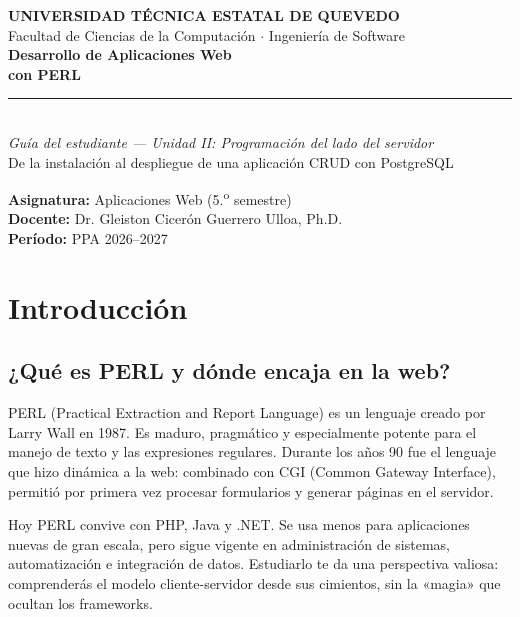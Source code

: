 \documentclass[11pt]{article}
\begin{document}
\begin{titlepage}
\vspace*{1.2cm}
{\color{uteqverde}\bfseries\large UNIVERSIDAD T\'ECNICA ESTATAL DE QUEVEDO}\\[2pt]
{\color{gray} Facultad de Ciencias de la Computaci\'on $\cdot$ Ingenier\'ia de Software}\\[2.2cm]
{\color{tinta}\bfseries\fontsize{30}{34}\selectfont Desarrollo de Aplicaciones Web}\\[6pt]
{\color{uteqverde}\bfseries\fontsize{30}{34}\selectfont con PERL}\\[10pt]
{\color{uteqoro}\rule{\linewidth}{2.2pt}}\\[10pt]
{\itshape\large Gu\'ia del estudiante --- Unidad II: Programaci\'on del lado del servidor}\\[4pt]
{\color{gray} De la instalaci\'on al despliegue de una aplicaci\'on CRUD con PostgreSQL}\\[3cm]
\begin{flushleft}
\textbf{Asignatura:} Aplicaciones Web (5.\textsuperscript{o} semestre)\\[3pt]
\textbf{Docente:} Dr. Gleiston Cicer\'on Guerrero Ulloa, Ph.D.\\[3pt]
\textbf{Per\'iodo:} PPA 2026--2027
\end{flushleft}
\vfill
\end{titlepage}
\tableofcontents
\clearpage
\section{Introducción}
\subsection{¿Qué es PERL y dónde encaja en la web?}
PERL (Practical Extraction and Report Language) es un lenguaje creado por Larry Wall en 1987. Es maduro, pragmático y especialmente potente para el manejo de texto y las expresiones regulares. Durante los años 90 fue el lenguaje que hizo dinámica a la web: combinado con CGI (Common Gateway Interface), permitió por primera vez procesar formularios y generar páginas en el servidor.

Hoy PERL convive con PHP, Java y .NET. Se usa menos para aplicaciones nuevas de gran escala, pero sigue vigente en administración de sistemas, automatización e integración de datos. Estudiarlo te da una perspectiva valiosa: comprenderás el modelo cliente-servidor desde sus cimientos, sin la «magia» que ocultan los frameworks.
\end{document}
